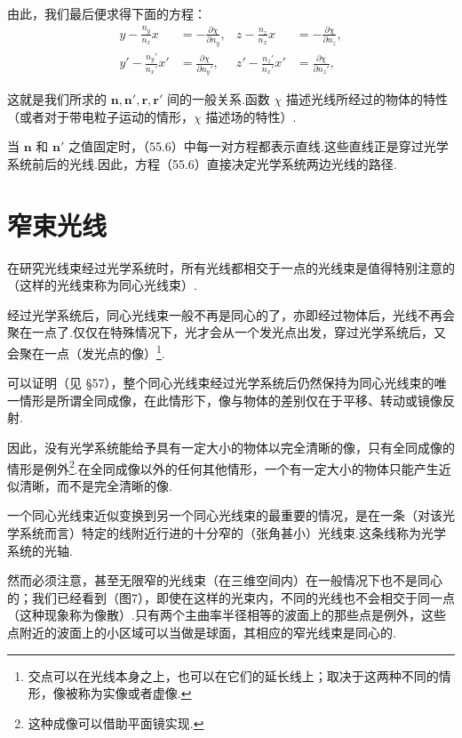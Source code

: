 由此，我们最后便求得下面的方程：
\begin{equation}
\begin{aligned}
  y-\frac{n_y}{n_x}x&=-\frac{\partial\chi}{\partial n_y}, &
  z-\frac{n_z}{n_x}x&=-\frac{\partial\chi}{\partial n_z},\\
  y'-\frac{n_y'}{n_x'}x'&=\frac{\partial\chi}{\partial n_y'}, &
  z'-\frac{n_z'}{n_x'}x'&=\frac{\partial\chi}{\partial n_z'},
\end{aligned}
\end{equation}

这就是我们所求的 $\boldsymbol{n},\boldsymbol{n}',\boldsymbol{r},\boldsymbol{r}'$ 间的一般关系.函数 $\chi$ 描述光线所经过的物体的特性（或者对于带电粒子运动的情形，$\chi$ 描述场的特性）.

当 $\boldsymbol{n}$ 和 $\boldsymbol{n}'$ 之值固定时，（55.6）中每一对方程都表示直线.这些直线正是穿过光学系统前后的光线.因此，方程（55.6）直接决定光学系统两边光线的路径.

\section{窄束光线}

在研究光线束经过光学系统时，所有光线都相交于一点的光线束是值得特别注意的（这样的光线束称为同心光线束）.

经过光学系统后，同心光线束一般不再是同心的了，亦即经过物体后，光线不再会聚在一点了.仅仅在特殊情况下，光才会从一个发光点出发，穿过光学系统后，又会聚在一点（发光点的像）\footnote{交点可以在光线本身之上，也可以在它们的延长线上；取决于这两种不同的情形，像被称为实像或者虚像.}.

可以证明（见 §57），整个同心光线束经过光学系统后仍然保持为同心光线束的唯一情形是所谓全同成像，在此情形下，像与物体的差别仅在于平移、转动或镜像反射.

因此，没有光学系统能给予具有一定大小的物体以完全清晰的像，只有全同成像的情形是例外\footnote{这种成像可以借助平面镜实现.}.在全同成像以外的任何其他情形，一个有一定大小的物体只能产生近似清晰，而不是完全清晰的像.

一个同心光线束近似变换到另一个同心光线束的最重要的情况，是在一条（对该光学系统而言）特定的线附近行进的十分窄的（张角甚小）光线束.这条线称为光学系统的光轴.

然而必须注意，甚至无限窄的光线束（在三维空间内）在一般情况下也不是同心的；我们已经看到（图7），即使在这样的光束内，不同的光线也不会相交于同一点（这种现象称为像散）.只有两个主曲率半径相等的波面上的那些点是例外，这些点附近的波面上的小区域可以当做是球面，其相应的窄光线束是同心的.

